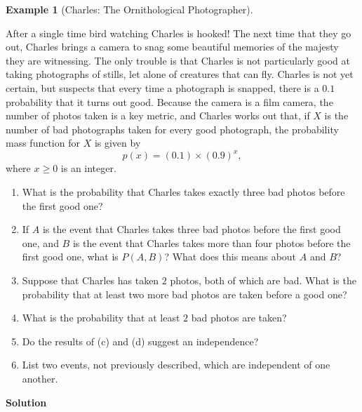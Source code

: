 \documentclass[
  letterpaper,
  DIV=11,
  numbers=noendperiod]{scrreprt}
\providecommand{\tightlist}{%
  \setlength{\itemsep}{0pt}\setlength{\parskip}{0pt}}\usepackage{longtable,booktabs,array}
\theoremstyle{definition}
\theoremstyle{definition}
\newtheorem{example}{Example}[chapter]
\theoremstyle{definition}
\theoremstyle{remark}
\begin{document}
\begin{example}[Charles: The Ornithological
Photographer]\protect\hypertarget{exm-condition-joint-probability}{}\label{exm-condition-joint-probability}

After a single time bird watching Charles is hooked! The next time that
they go out, Charles brings a camera to snag some beautiful memories of
the majesty they are witnessing. The only trouble is that Charles is not
particularly good at taking photographs of stills, let alone of
creatures that can fly. Charles is not yet certain, but suspects that
every time a photograph is snapped, there is a \(0.1\) probability that
it turns out good. Because the camera is a film camera, the number of
photos taken is a key metric, and Charles works out that, if \(X\) is
the number of bad photographs taken for every good photograph, the
probability mass function for \(X\) is given by
\[p(x) = (0.1)\times (0.9)^{x},\] where \(x \geq 0\) is an integer.

\begin{enumerate}
\def\labelenumi{\alph{enumi}.}
\tightlist
\item
  What is the probability that Charles takes exactly three bad photos
  before the first good one?
\item
  If \(A\) is the event that Charles takes three bad photos before the
  first good one, and \(B\) is the event that Charles takes more than
  four photos before the first good one, what is \(P(A,B)\)? What does
  this means about \(A\) and \(B\)?
\item
  Suppose that Charles has taken \(2\) photos, both of which are bad.
  What is the probability that at least two more bad photos are taken
  before a good one?
\item
  What is the probability that at least \(2\) bad photos are taken?
\item
  Do the results of (c) and (d) suggest an independence?
\item
  List two events, not previously described, which are independent of
  one another.
\end{enumerate}

\begin{tcolorbox}[enhanced jigsaw, colback=white, colframe=quarto-callout-color-frame, arc=.35mm, leftrule=.75mm, rightrule=.15mm, opacityback=0, breakable, bottomrule=.15mm, left=2mm, toprule=.15mm]

\vspace{-3mm}\textbf{Solution}\vspace{3mm}


\end{tcolorbox}
\end{example}
\end{document}
